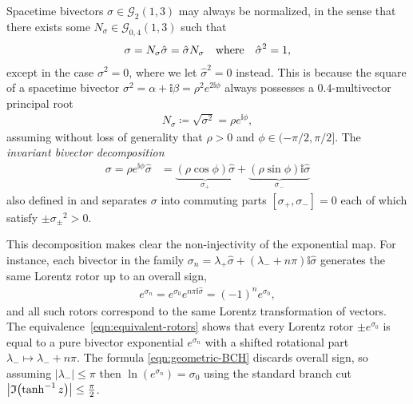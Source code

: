 \documentclass[12pt,a4paper]{article}
\makeatletter
\newcommand\x[1]{\@nameuse{\detokenize{#1}}}
\newcommand{\GA}[1][]{\mathcal{G}_{#1}}
\newcommand{\vol}{\mathbb{i}}
\newcommand{\IM}[1]{\mathfrak{I}\qty(#1)}
\makeatother
\begin{document}
Spacetime bivectors $\sigma{} \in \GA[2](1,3)$ may always be normalized, in the sense that there exists some $N_\sigma{} \in \GA[0,4](1,3)$ such that
\begin{align}
	\sigma{} = N_\sigma{}\hat{\sigma{}} = \hat{\sigma{}}N_\sigma{}
	\qqtext{where}
	\hat{\sigma{}}^2 = 1
,\end{align}
except in the case $\sigma{}^2 = 0$, where we let $\hat{\sigma{}}^2 = 0$ instead.
This is because the square of a spacetime bivector $\sigma{}^2 = \alpha{} + \vol \beta{} = \rho{}^2e^{2\vol \phi{}}$ always possesses a $\qty{0, 4}$-multivector principal root
\begin{align}
	N_\sigma{}
	\coloneqq \sqrt{\sigma{}^2}
	= \rho{}e^{\vol \phi{}}
	\label{eqn:spacetime-bivector-normalizer}
,\end{align}
assuming without loss of generality that $\rho{} > 0$ and $\phi{} \in (-\pi{}/2, \pi{}/2]$.
The \emph{invariant bivector decomposition}
\begin{align}
	\sigma{} = \rho{}e^{\vol \phi{}}\hat{\sigma{}}
	&= \underbrace{(\rho{}\cos \phi{})\hat{\sigma{}}}_{\sigma{}_+} + \underbrace{(\rho{}\sin \phi{})\vol\hat{\sigma{}}}_{\sigma{}_-}
\end{align}
also defined in \cite[\textsection{}\,5.4.1]{doran2003ga} and \cite{hestenes2003sta} separates $\sigma{}$ into commuting parts $[\sigma{}_+, \sigma{}_-] = 0$ each of which satisfy $\pm{}\sigma{}_\pm{}^2 > 0$.

This decomposition makes clear the non-injectivity of the exponential map.
For instance, each bivector in the family
\begin{math}
	\sigma{}_{n} = \lambda{}_+\hat \sigma{} + (\lambda{}_- + n\pi{})\vol\hat \sigma{}
	\label{eqn:equivalent-generators}
\end{math}
generates the same Lorentz rotor up to an overall sign,
\begin{align}
	e^{\sigma{}_{n}} = e^{\sigma{}_{0}}e^{n\pi{}\vol\hat \sigma{}} = (-1)^ne^{\sigma{}_{0}}
	\label{eqn:equivalent-rotors}
,\end{align}
and all such rotors correspond to the same Lorentz transformation of vectors.
The equivalence~\ref{eqn:equivalent-rotors} shows that every Lorentz rotor $\pm{}e^{\sigma{}_0}$ is equal to a pure bivector exponential $e^{\sigma{}_n}$ with a shifted rotational part $\lambda{}_- \mapsto \lambda{}_- + n\pi$.
The \x{BCH} formula \eqref{eqn:geometric-BCH} discards overall sign, so assuming $|\lambda{}_-| \leq{} \pi{}$ then $\ln(e^{\sigma{}_{n}}) = \sigma{}_{0}$ using the standard branch cut $\qty|\IM{\tanh^{-1} z}| \leq{} \frac{\pi{}}{2}$.
\end{document}
